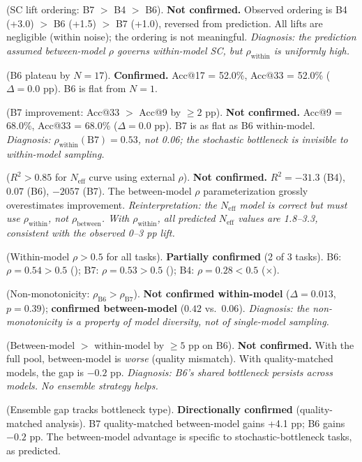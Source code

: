 \documentclass{article}
\theoremstyle{definition}
\theoremstyle{remark}
\begin{document}
\begin{description}[leftmargin=*,itemsep=2pt]
    \item[\textbf{P1}] (SC lift ordering: B7 $>$ B4 $>$ B6). \textbf{Not confirmed.}
    Observed ordering is B4 (+3.0) $>$ B6 (+1.5) $>$ B7 (+1.0), reversed from prediction.
    All lifts are negligible (within noise); the ordering is not meaningful.
    \emph{Diagnosis: the prediction assumed between-model $\rho$ governs within-model SC, but $\rho_{\text{within}}$ is uniformly high.}

    \item[\textbf{P2}] (B6 plateau by $N = 17$). \textbf{Confirmed.}
    Acc@17 = 52.0\%, Acc@33 = 52.0\% ($\Delta = 0.0$ pp). B6 is flat from $N = 1$.

    \item[\textbf{P3}] (B7 improvement: Acc@33 $>$ Acc@9 by $\geq 2$ pp). \textbf{Not confirmed.}
    Acc@9 = 68.0\%, Acc@33 = 68.0\% ($\Delta = 0.0$ pp). B7 is as flat as B6 within-model.
    \emph{Diagnosis: $\rho_{\text{within}}(\text{B7}) = 0.53$, not 0.06; the stochastic bottleneck is invisible to within-model sampling.}

    \item[\textbf{P4}] ($R^2 > 0.85$ for $N_{\text{eff}}$ curve using external $\rho$). \textbf{Not confirmed.}
    $R^2 = -31.3$ (B4), $0.07$ (B6), $-2057$ (B7). The between-model $\rho$ parameterization grossly overestimates improvement.
    \emph{Reinterpretation: the $N_{\text{eff}}$ model is correct but must use $\rho_{\text{within}}$, not $\rho_{\text{between}}$. With $\rho_{\text{within}}$, all predicted $N_{\text{eff}}$ values are 1.8--3.3, consistent with the observed 0--3 pp lift.}

    \item[\textbf{P5}] (Within-model $\rho > 0.5$ for all tasks). \textbf{Partially confirmed} (2 of 3 tasks).
    B6: $\rho = 0.54 > 0.5$ (\checkmark); B7: $\rho = 0.53 > 0.5$ (\checkmark); B4: $\rho = 0.28 < 0.5$ ($\times$).

    \item[\textbf{P6}] (Non-monotonicity: $\rho_{\text{B6}} > \rho_{\text{B7}}$). \textbf{Not confirmed within-model} ($\Delta = 0.013$, $p = 0.39$); \textbf{confirmed between-model} ($0.42$ vs.\ $0.06$).
    \emph{Diagnosis: the non-monotonicity is a property of model diversity, not of single-model sampling.}

    \item[\textbf{P7}] (Between-model $>$ within-model by $\geq 5$ pp on B6). \textbf{Not confirmed.}
    With the full pool, between-model is \emph{worse} (quality mismatch). With quality-matched models, the gap is $-0.2$ pp.
    \emph{Diagnosis: B6's shared bottleneck persists across models. No ensemble strategy helps.}

    \item[\textbf{P8}] (Ensemble gap tracks bottleneck type). \textbf{Directionally confirmed} (quality-matched analysis).
    B7 quality-matched between-model gains +4.1 pp; B6 gains $-0.2$ pp. The between-model advantage is specific to stochastic-bottleneck tasks, as predicted.
\end{description}
\end{document}

